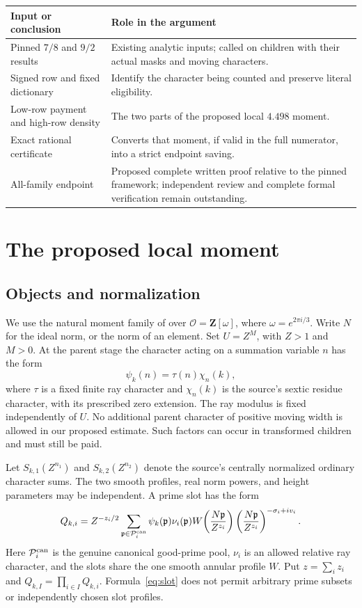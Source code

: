 \documentclass[11pt]{article}
\theoremstyle{definition}
\newcommand{\Z}{\mathbf Z}
\newcommand{\OO}{\mathcal O}
\begin{document}
\begin{center}\small
\begin{tabularx}{\textwidth}{@{}p{}X@{}}
\toprule
Input or conclusion & Role in the argument\\
\midrule
Pinned $7/8$ and $9/2$ results & Existing analytic inputs; called on children with their actual masks and moving characters.\\
Signed row and fixed dictionary & Identify the character being counted and preserve literal eligibility.\\
Low-row payment and high-row density & The two parts of the proposed local $4.498$ moment.\\
Exact rational certificate & Converts that moment, if valid in the full numerator, into a strict endpoint saving.\\
All-family endpoint & Proposed complete written proof relative to the pinned framework; independent review and complete formal verification remain outstanding.\\
\bottomrule
\end{tabularx}
\end{center}

\section{The proposed local moment}\label{sec:moment}

\subsection{Objects and normalization}
We use the natural moment family of \cite[Appendix B3.4]{collet} over
$\OO=\Z[\omega]$, where $\omega=e^{2\pi i/3}$. Write $N$ for the
ideal norm, or the norm of an element. Set $U=Z^M$, with $Z>1$ and
$M>0$. At the parent stage the character acting on a summation variable
$n$ has the form
\[
 \psi_k(n)=\tau(n)\chi_n(k),
\]
where $\tau$ is a fixed finite ray character and $\chi_n(k)$ is the
source's sextic residue character, with its prescribed zero extension.
The ray modulus is fixed independently of $U$. No additional parent
character of positive moving width is allowed in our proposed estimate.
Such factors can occur in transformed children and must still be paid.

Let $S_{k,1}(Z^{n_1})$ and $S_{k,2}(Z^{n_2})$ denote the source's
centrally normalized ordinary character sums. The two smooth profiles,
real norm powers, and height parameters may be independent. A prime
slot has the form
\begin{equation}\label{eq:slot}
 Q_{k,i}=Z^{-z_i/2}
 \sum_{\mathfrak p\in\mathcal P_i^{\rm can}}
 \psi_k(\mathfrak p)\nu_i(\mathfrak p)
 W\!\left(\frac{N\mathfrak p}{Z^{z_i}}\right)
 \left(\frac{N\mathfrak p}{Z^{z_i}}\right)^{-\sigma_i+iv_i}.
\end{equation}
Here $\mathcal P_i^{\rm can}$ is the genuine canonical good-prime pool,
$\nu_i$ is an allowed relative ray character, and the slots share the
one smooth annular profile $W$. Put $z=\sum_i z_i$ and
$Q_{k,I}=\prod_{i\in I}Q_{k,i}$. Formula~\eqref{eq:slot} does not
permit arbitrary prime subsets or independently chosen slot profiles.
\end{document}

